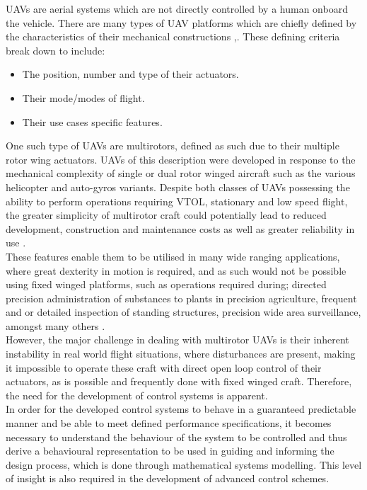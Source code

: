 \documentclass[12pt,a4paper,twoside]{report}
\begin{document}
			UAVs are aerial systems which are not directly controlled by a human onboard the vehicle. There are many types of UAV platforms which are chiefly defined by the characteristics of their mechanical constructions \cite{3},\cite{4}. These defining criteria break down to include:
			
			\begin{itemize}
				\item
					The position, number and type of their actuators.
				\item 
					Their mode/modes of flight. 
				\item 
					Their use cases specific features.
			\end{itemize}
			\space
			One such type of UAVs are multirotors, defined as such due to their multiple rotor wing actuators. UAVs of this description were developed in response to the mechanical complexity of single or dual rotor winged aircraft such as the various helicopter and auto-gyros variants. Despite both classes of UAVs possessing the ability to perform operations requiring VTOL, stationary and low speed flight, the greater simplicity of multirotor craft could potentially lead to reduced development, construction and maintenance costs as well as greater reliability in use \cite{12}.
			\\
			These features enable them to be utilised in many wide ranging applications, where great dexterity in motion is required, and as such would not be possible using fixed winged platforms, such as operations required during; directed precision administration of substances to plants in precision agriculture, frequent and or detailed inspection of standing structures, precision wide area surveillance, amongst many others \cite{6}.
			\\
			However, the major challenge in dealing with multirotor UAVs is their inherent instability in real world flight situations, where disturbances are present, making it impossible to operate these craft with direct open loop control of their actuators, as is possible and frequently done with fixed winged craft. Therefore, the need for the development of control systems is apparent. 
			\\
			In order for the developed control systems to behave in a guaranteed predictable manner and be able to meet defined performance specifications, it becomes necessary to understand the behaviour of the system to be controlled and thus derive a behavioural representation to be used in guiding and informing the design process, which is done through mathematical systems modelling. This level of insight is also required in the development of advanced control schemes.
		
\end{document}

